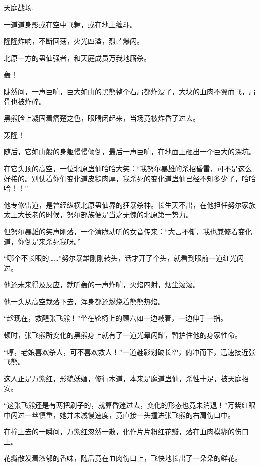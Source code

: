 
\begin{this_body}

天庭战场.

一道道身影或在空中飞舞，或在地上缠斗。

隆隆炸响，不断回荡，火光四溢，烈芒爆闪。

北原一方的蛊仙强者，和天庭成员万我地厮杀。

轰！

陡然间，一声巨响，巨大如山的黑熊整个右肩都炸没了，大块的血肉不翼而飞，肩骨也被炸碎。

黑熊脸上凝固着痛楚之色，眼睛闭起来，当场竟被炸昏了过去。

轰隆！

随后，它如山般的身躯慢慢倾倒，最后一声巨响，在地面上砸出一个巨大的深坑。

在它头顶的高空，一位北原蛊仙哈哈大笑：“我努尔暴雄的杀招昏雷，可不是这么好接的。别仗着你们变化道皮糙肉厚，我杀死的变化道蛊仙已经不知多少了，哈哈哈！！”

他专修雷道，是曾经纵横北原蛊仙界的狂暴杀神。长生天不出，在他担任努尔家族太上大长老的时候，努尔部族便是当之无愧的北原第一势力。

但努尔暴雄的笑声刚落，一个清脆动听的女音传来：“大言不惭，我也兼修着变化道，你倒是来杀死我呀。”

“哪个不长眼的……”努尔暴雄刚刚转头，话才开了个头，就看到眼前一道红光闪过。

他还未来得及反应，就听轰的一声炸响，火焰四射，烟尘滚滚。

他一头从高空栽落下去，浑身都还燃烧着熊熊热焰。

“趁现在，救醒张飞熊！”坐在轮椅上的顾六如一边喊着，一边伸手一指。

顿时，张飞熊所变化的黑熊身上就有了一道光晕闪耀，暂护住他的身家性命。

“哼，老娘喜欢杀人，可不喜欢救人！”一道魅影划破长空，俯冲而下，迅速接近张飞熊。

这人正是万紫红，形貌妖媚，修行木道，本来是魔道蛊仙，杀性十足，被天庭招安。

“这张飞熊还是有两把刷子的，就算昏迷过去，变化的形态也竟未消退！”万紫红眼中闪过一丝慎重，她并未减慢速度，竟直接一头撞进张飞熊的右肩伤口中。

在撞上去的一瞬间，万紫红忽然一散，化作片片粉红花瓣，落在血肉模糊的伤口上。

花瓣散发着浓郁的香味，随后竟在血肉伤口上，飞快地长出了一朵朵的鲜花。


\end{this_body}
